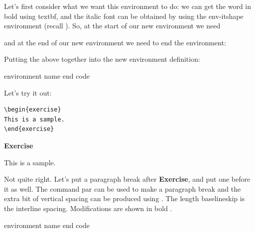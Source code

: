 Let's first consider what we want this environment to do: we can get
the word  in bold using \gls{textbf},
and the italic font can be
obtained by using the \gls{env-itshape} environment (recall
).  
So, at the start of our
new environment we need
\begin{codeS}
\end{codeS}
and at the end of our new
environment we need to end the  environment:
\begin{codeS}
\end{codeS}
Putting the above together into the new environment definition:
\begin{code}\obeyspaces
{} environment name\newline
{}\newline
{} end code
\end{code}
Let's try it out:
\begin{code}
\begin{verbatim}
\begin{exercise}
This is a sample.
\end{exercise}
\end{verbatim}
\end{code}%
\begin{resultS}
\textbf{Exercise}
\begin{itshape}
This is a sample.
\end{itshape}
\end{resultS}
Not quite right.  Let's put a paragraph break after
\textbf{Exercise}, and put one before it as well. The command
\gls{par} can be used to make a paragraph break and the extra bit of
vertical spacing can be produced using . The
\gls{length} \gls{baselineskip} is the interline spacing.
Modifications are shown in bold .
\begin{code}\obeyspaces
{} environment name\newline
{}\newline
{} end code
\end{code}%
